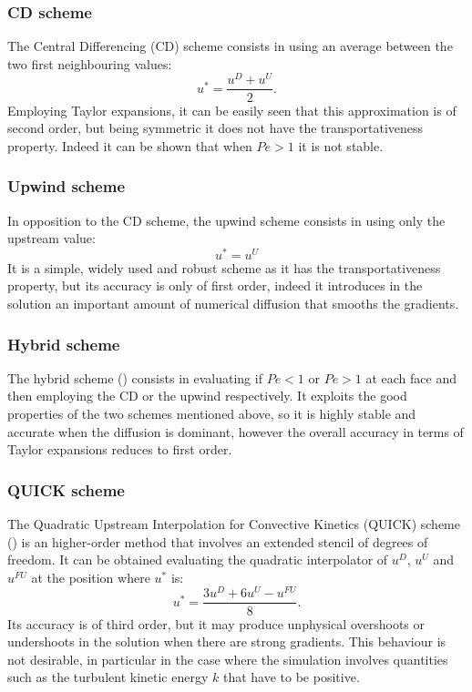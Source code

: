 \subsubsection{CD scheme}
The Central Differencing (CD) scheme consists in using an average between the 
two first neighbouring values:
\begin{equation} \label{eq:cd}
	u^* = \frac{u^D + u^U}{2}.
\end{equation}
Employing Taylor expansions, it can be easily seen that this approximation is 
of second order, but being symmetric it does not have the transportativeness 
property. Indeed it can be shown that when $Pe > 1$ it is not stable.
%
\subsubsection{Upwind scheme}
In opposition to the CD scheme, the upwind scheme consists in using only the 
upstream value:
\begin{equation}
	u^* = u^U
\end{equation}
It is a simple, widely used and robust scheme as it has the transportativeness 
property, but its accuracy is only of first order, indeed it introduces in the 
solution an important amount of numerical diffusion that smooths the gradients. 
%
\subsubsection{Hybrid scheme}
The hybrid scheme (\cite{diff:hybrid}) consists in evaluating if $Pe<1$ or 
$Pe>1$ at each face and then employing the CD or the upwind respectively. It 
exploits the good properties of the two schemes mentioned above, so it is 
highly stable and accurate when the diffusion is dominant, however the overall 
accuracy in terms of Taylor expansions reduces to first order.
%
\subsubsection{QUICK scheme}
The Quadratic Upstream Interpolation for Convective Kinetics (QUICK) scheme 
(\cite{fv:leonard}) is an higher-order method that involves an extended stencil 
of degrees of freedom. It can be obtained evaluating the quadratic interpolator 
of $u^D$, $u^U$ and 
$u^{FU}$ at the position where $u^*$ is:
\begin{equation} \label{eq:quick}
	u^* = \frac{3u^D + 6u^U - u^{FU}}{8}.
\end{equation}
Its accuracy is of third order, but it may produce unphysical overshoots or 
undershoots in the solution when there are strong gradients. This behaviour is 
not desirable, in particular in the case where the simulation involves 
quantities such as the turbulent kinetic energy $k$ that have to be positive. 
%
